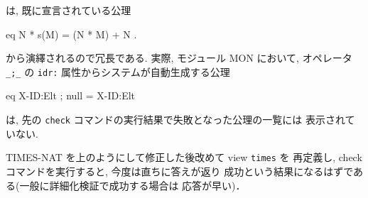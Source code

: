 は, 既に宣言されている公理

\begin{vvtm}
\begin{simplev}
 eq N * s(M) = (N * M) + N .
\end{simplev}
\end{vvtm}

から演繹されるので冗長である. 
実際, モジュール MON において, オペレータ \texttt{\_;\_} の 
\texttt{idr:} 属性からシステムが自動生成する公理

\begin{vvtm}
\begin{simplev}
 eq X-ID:Elt ; null = X-ID:Elt
\end{simplev}
\end{vvtm}
は, 先の \texttt{check} コマンドの実行結果で失敗となった公理の一覧には
表示されていない.

TIMES-NAT を上のようにして修正した後改めて view \texttt{times} を
再定義し, check コマンドを実行すると, 今度は直ちに答えが返り
成功という結果になるはずである(一般に詳細化検証で成功する場合は
応答が早い)．


